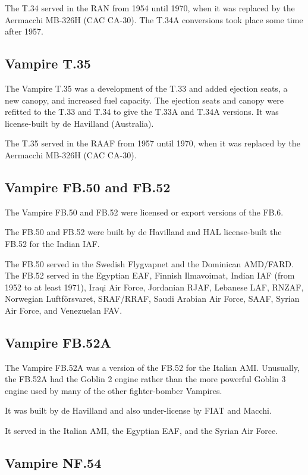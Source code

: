 The T.34 served in the RAN from 1954 until 1970, when it was replaced by the Aermacchi MB-326H (CAC CA-30). The T.34A conversions took place some time after 1957.

\subsection{Vampire T.35}

The Vampire T.35 was a development of the T.33 and added ejection seats, a new canopy, and increased fuel capacity. The ejection seats and canopy were refitted to the T.33 and T.34 to give the T.33A and T.34A versions. It was license-built by de Havilland (Australia).

The T.35 served in the RAAF from 1957 until 1970, when it was replaced by the Aermacchi MB-326H (CAC CA-30).

\subsection{Vampire FB.50 and FB.52}

The Vampire FB.50 and FB.52 were licensed or export versions of the FB.6.

The FB.50 and FB.52 were built by de Havilland and HAL license-built the FB.52 for the Indian IAF.

The FB.50 served in the Swedish Flygvapnet and the Dominican AMD/FARD. The FB.52 served in the Egyptian EAF, Finnish Ilmavoimat, Indian IAF (from 1952 to at least 1971), Iraqi Air Force, Jordanian RJAF, Lebanese LAF, RNZAF, Norwegian Luftförsvaret, SRAF/RRAF, Saudi Arabian Air Force, SAAF, Syrian Air Force, and Venezuelan FAV.

\subsection{Vampire FB.52A}

The Vampire FB.52A was a version of the FB.52 for the Italian AMI. Unusually, the FB.52A had the Goblin 2 engine rather than the more powerful Goblin 3 engine used by many of the other fighter-bomber Vampires.

It was built by de Havilland and also under-license by FIAT and Macchi.

It served in the Italian AMI, the Egyptian EAF, and the Syrian Air Force.

\subsection{Vampire NF.54}

